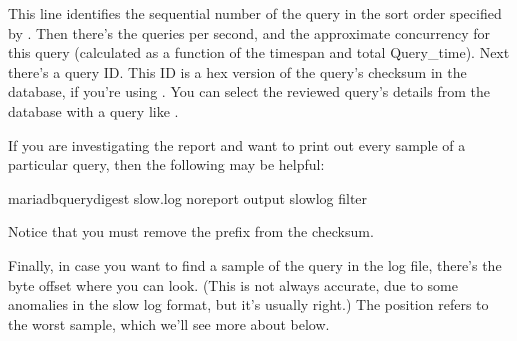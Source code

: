 \documentclass[letterpaper,10pt,english]{sphinxmanual}
\begin{document}
\begin{sphinxVerbatim}[commandchars=\\\{\}]
\end{sphinxVerbatim}

This line identifies the sequential number of the query in the sort order
specified by {\hyperref[\detokenize{mariadb-query-digest:cmdoption-mariadb-query-digest-order-by}]{}}.  Then there’s the queries per second, and the
approximate concurrency for this query (calculated as a function of the timespan
and total Query\_time).  Next there’s a query ID.  This ID is a hex version of
the query’s checksum in the database, if you’re using {\hyperref[\detokenize{mariadb-query-digest:cmdoption-mariadb-query-digest-review}]{}}.  You can
select the reviewed query’s details from the database with a query like .

If you are investigating the report and want to print out every sample of a
particular query, then the following {\hyperref[\detokenize{mariadb-query-digest:cmdoption-mariadb-query-digest-filter}]{}} may be helpful:

\begin{sphinxVerbatim}[commandchars=\\\{\}]
mariadb\PYGZhy{}query\PYGZhy{}digest slow.log           
   \PYGZhy{}\PYGZhy{}no\PYGZhy{}report                     
   \PYGZhy{}\PYGZhy{}output slowlog                
   \PYGZhy{}\PYGZhy{}filter 
\end{sphinxVerbatim}

Notice that you must remove the  prefix from the checksum.

Finally, in case you want to find a sample of the query in the log file, there’s
the byte offset where you can look.  (This is not always accurate, due to some
anomalies in the slow log format, but it’s usually right.)  The position
refers to the worst sample, which we’ll see more about below.
\end{document}
